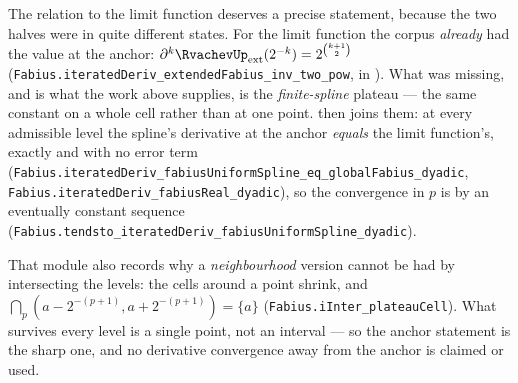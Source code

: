 \documentclass[11pt,oneside]{article}
\numberwithin{equation}{section}
\theoremstyle{definition}
\theoremstyle{remark}
\begin{document}
\begin{obligation}
The relation to the limit function deserves a precise statement, because the two halves
were in quite different states.  For the limit function the corpus \emph{already} had the
value at the anchor: \(\partial^{k}\RvachevUp_{\mathrm{ext}}(2^{-k})=2^{\binom{k+1}{2}}\)
(\nolinkurl{Fabius.iteratedDeriv_extendedFabius_inv_two_pow}, in ).
What was missing, and is what the work above supplies, is the \emph{finite-spline} plateau ---
the same constant on a whole cell rather than at one point.   then
joins them: at every admissible level the spline's derivative at the anchor \emph{equals}
the limit function's, exactly and with no error term
(\nolinkurl{Fabius.iteratedDeriv_fabiusUniformSpline_eq_globalFabius_dyadic},
\nolinkurl{Fabius.iteratedDeriv_fabiusReal_dyadic}), so the convergence in \(p\) is by an
eventually constant sequence
(\nolinkurl{Fabius.tendsto_iteratedDeriv_fabiusUniformSpline_dyadic}).

That module also records why a \emph{neighbourhood} version cannot be had by intersecting
the levels: the cells around a point shrink, and
\(\bigcap_p\left(a-2^{-(p+1)},a+2^{-(p+1)}\right)=\{a\}\)
(\nolinkurl{Fabius.iInter_plateauCell}).  What survives every level is a single point, not
an interval --- so the anchor statement is the sharp one, and no derivative convergence away
from the anchor is claimed or used.
\end{obligation}
\end{document}

